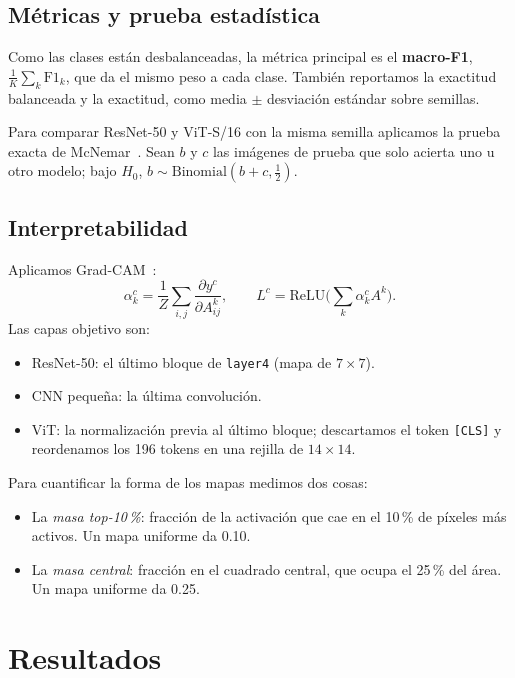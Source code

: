 \documentclass[conference,a4paper]{IEEEtran}
\begin{document}
\subsection{Métricas y prueba estadística}
Como las clases están desbalanceadas, la métrica principal es el \textbf{macro-F1}, $\frac{1}{K}\sum_k \mathrm{F1}_k$, que da el mismo peso a cada clase. También reportamos la exactitud balanceada y la exactitud, como media $\pm$ desviación estándar sobre semillas.

Para comparar ResNet-50 y ViT-S/16 con la misma semilla aplicamos la prueba exacta de McNemar~\cite{dietterich1998tests}. Sean $b$ y $c$ las imágenes de prueba que solo acierta uno u otro modelo; bajo $H_0$, $b\sim\mathrm{Binomial}(b+c,\tfrac12)$.

\subsection{Interpretabilidad}
Aplicamos Grad-CAM~\cite{selvaraju2017gradcam}:
\begin{equation}
\alpha_k^c=\frac{1}{Z}\sum_{i,j}\frac{\partial y^c}{\partial A^k_{ij}},\qquad
L^c=\mathrm{ReLU}\Big(\sum_k \alpha_k^c A^k\Big).
\end{equation}
Las capas objetivo son:
\begin{itemize}
\item ResNet-50: el último bloque de \texttt{layer4} (mapa de $7\times7$).
\item CNN pequeña: la última convolución.
\item ViT: la normalización previa al último bloque; descartamos el token \texttt{[CLS]} y reordenamos los 196 tokens en una rejilla de $14\times14$.
\end{itemize}
Para cuantificar la forma de los mapas medimos dos cosas:
\begin{itemize}
\item La \emph{masa top-10\,\%}: fracción de la activación que cae en el 10\,\% de píxeles más activos. Un mapa uniforme da 0.10.
\item La \emph{masa central}: fracción en el cuadrado central, que ocupa el 25\,\% del área. Un mapa uniforme da 0.25.
\end{itemize}

\section{Resultados}
\end{document}
